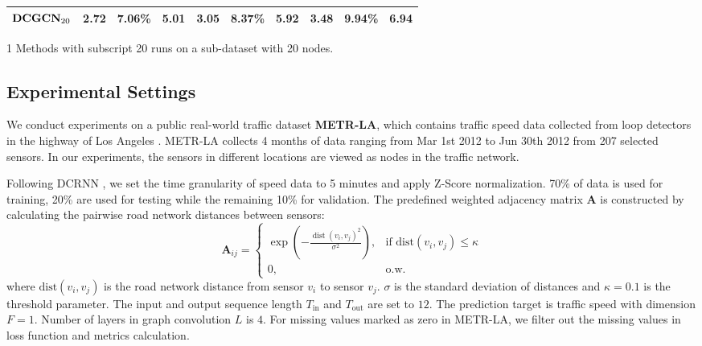 \documentclass[letterpaper, 10 pt, conference]{ieeeconf}
\begin{document}
\begin{table}[t]
\begin{threeparttable}
{{\begin{tabular}{cccccccccc}
                $\text{\textbf{DCGCN}}_{20}$ &  \textbf{2.72}  & \textbf{7.06\%} & \textbf{5.01}  & \textbf{3.05}  & \textbf{8.37\%}  & \textbf{5.92}  & \textbf{3.48}  & \textbf{9.94\%}  & \textbf{6.94}\\
                \bottomrule
                \end{tabular}
                }}
                \begin{tablenotes}
                        \scriptsize
                        \item[1] Methods with subscript 20 runs on a sub-dataset with 20 nodes.
                \end{tablenotes}
        \end{threeparttable}
\end{table}

\subsection{Experimental Settings}
We conduct experiments on a public real-world traffic dataset \textbf{METR-LA}, which contains traffic speed data collected from loop detectors in the highway of Los Angeles \cite{jagadish2014big}. METR-LA collects 4 months of data ranging from Mar 1st 2012 to Jun 30th 2012 from 207 selected sensors. In our experiments, the sensors in different locations are viewed as nodes in the traffic network.

Following DCRNN \cite{li2017diffusion}, we set the time granularity of speed data to 5 minutes and apply Z-Score normalization. 70\% of data is used for training, 20\% are used for testing while the remaining 10\% for validation. The predefined weighted adjacency matrix $\mathbf{A}$ is constructed by calculating the pairwise road network distances between sensors:
\begin{equation}
        \mathbf{A}_{ij}=
        \begin{cases}
                \exp\left(-\frac{\operatorname{dist}\left(v_i, v_j\right)^2}{\sigma^2}\right),&\text{if $\text{dist}(v_i,v_j)\leq \kappa$}\\
                0,&\text{o.w.}
        \end{cases}
\end{equation}
where $\text{dist}(v_i,v_j)$ is the road network distance from sensor $v_i$ to sensor $v_j$. $\sigma$ is the standard deviation of distances and $\kappa=0.1$ is the threshold parameter. The input and output sequence length $T_\text{in}$ and $T_\text{out}$ are set to $12$. The prediction target is traffic speed with dimension $F=1$. Number of layers in graph convolution $L$ is $4$. For missing values marked as zero in METR-LA, we filter out the missing values in loss function and metrics calculation.
\end{document}
